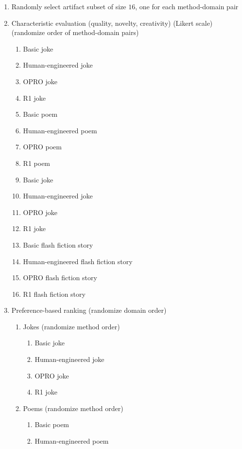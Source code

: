 \documentclass[phd,electronic,oneside,twosidetoc,letterpaper,chaptercenter,parttop,lof]{byumsphd}
\begin{document}
\begin{enumerate}
    \item Randomly select artifact subset of size $16$, one for each method-domain pair
    \item Characteristic evaluation (quality, novelty, creativity) (Likert scale) (randomize order of method-domain pairs)
    \begin{enumerate}
        \item Basic joke
        \item Human-engineered joke
        \item OPRO joke
        \item R1 joke
        \item Basic poem
        \item Human-engineered poem
        \item OPRO poem
        \item R1 poem
        \item Basic joke
        \item Human-engineered joke
        \item OPRO joke
        \item R1 joke
        \item Basic flash fiction story
        \item Human-engineered flash fiction story
        \item OPRO flash fiction story
        \item R1 flash fiction story
    \end{enumerate}
    \item Preference-based ranking (randomize domain order)
        \begin{enumerate}
        \item Jokes (randomize method order)
            \begin{enumerate}
                \item Basic joke
                \item Human-engineered joke
                \item OPRO joke
                \item R1 joke
            \end{enumerate}
            \item Poems (randomize method order)
            \begin{enumerate}
                \item Basic poem
                \item Human-engineered poem

\end{enumerate}
\end{enumerate}
\end{enumerate}
\end{document}
